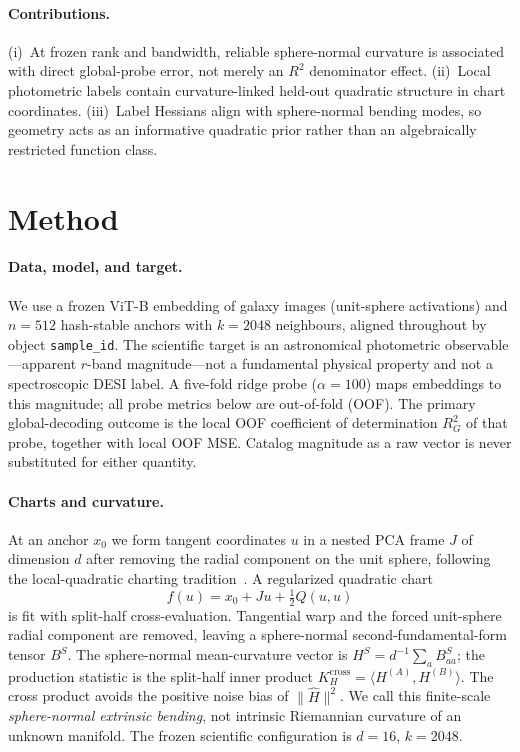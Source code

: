 \documentclass{article}
\begin{document}
\paragraph{Contributions.}
(i)~At frozen rank and bandwidth, reliable sphere-normal curvature is associated with direct global-probe error, not merely an $R^2$ denominator effect.
(ii)~Local photometric labels contain curvature-linked held-out quadratic structure in chart coordinates.
(iii)~Label Hessians align with sphere-normal bending modes, so geometry acts as an informative quadratic prior rather than an algebraically restricted function class.

\section{Method}
\label{sec:method}

\paragraph{Data, model, and target.}
We use a frozen ViT-B embedding of galaxy images (unit-sphere activations) and $n{=}512$ hash-stable anchors with $k{=}2048$ neighbours, aligned throughout by object \texttt{sample\_id}.
The scientific target is an astronomical photometric observable---apparent $r$-band magnitude---not a fundamental physical property and not a spectroscopic DESI label.
A five-fold ridge probe ($\alpha{=}100$) maps embeddings to this magnitude; all probe metrics below are out-of-fold (OOF).
The primary global-decoding outcome is the local OOF coefficient of determination $R_G^2$ of that probe, together with local OOF MSE.
Catalog magnitude as a raw vector is never substituted for either quantity.

\paragraph{Charts and curvature.}
At an anchor $x_0$ we form tangent coordinates $u$ in a nested PCA frame $J$ of dimension $d$ after removing the radial component on the unit sphere, following the local-quadratic charting tradition~\citep{donoho2003hessian}.
A regularized quadratic chart
\[
f(u)=x_0+Ju+\tfrac12 Q(u,u)
\]
is fit with split-half cross-evaluation.
Tangential warp and the forced unit-sphere radial component are removed, leaving a sphere-normal second-fundamental-form tensor $B^S$.
The sphere-normal mean-curvature vector is $H^S=d^{-1}\sum_a B^S_{aa}$; the production statistic is the split-half inner product $K_H^{\mathrm{cross}}=\langle H^{(A)},H^{(B)}\rangle$.
The cross product avoids the positive noise bias of $\|\widehat H\|^2$.
We call this finite-scale \emph{sphere-normal extrinsic bending}, not intrinsic Riemannian curvature of an unknown manifold.
The frozen scientific configuration is $d{=}16$, $k{=}2048$.
\end{document}
